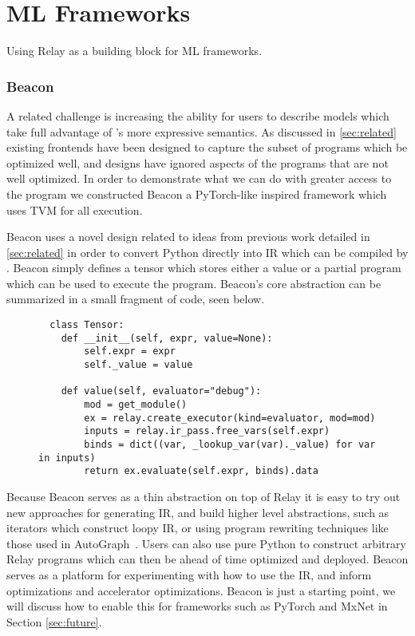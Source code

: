 \chapter{ML Frameworks}
\label{ch:frameworks}

Using Relay as a building block for ML frameworks.


\subsection{Beacon}

A related challenge is increasing the ability for users to describe models which take
  full advantage of \relay's more expressive semantics.
As discussed in \ref{sec:related} existing frontends have been designed to capture the
  subset of programs which be optimized well, and designs have ignored aspects of the
  programs that are not well optimized.
In order to demonstrate what we can do with greater access to the program we constructed
  Beacon a PyTorch-like inspired framework which uses TVM for all execution.

Beacon uses a novel design related to ideas from previous work detailed in \ref{sec:related}
  in order to convert Python directly into IR which can be compiled by \relay.
Beacon simply defines a tensor which stores either a value or a partial program
  which can be used to execute the program.
Beacon's core abstraction can be summarized in a small fragment of code, seen below.

\begin{figure}
\begin{verbatim}
  class Tensor:
    def __init__(self, expr, value=None):
        self.expr = expr
        self._value = value

    def value(self, evaluator="debug"):
        mod = get_module()
        ex = relay.create_executor(kind=evaluator, mod=mod)
        inputs = relay.ir_pass.free_vars(self.expr)
        binds = dict((var, _lookup_var(var)._value) for var in inputs)
        return ex.evaluate(self.expr, binds).data
\end{verbatim}
\end{figure}

Because Beacon serves as a thin abstraction on top of Relay it
  is easy to try out new approaches for generating IR, and build
  higher level abstractions, such as iterators which construct
  loopy IR, or using program rewriting techniques like those
  used in AutoGraph~\cite{AutoGraph}.
Users can also use pure Python to construct arbitrary Relay
  programs which can then be ahead of time optimized and
  deployed.
Beacon serves as a platform for experimenting with how
  to use the IR, and inform optimizations and accelerator optimizations.
Beacon is just a starting point, we will discuss how to enable this for frameworks
  such as PyTorch and MxNet in Section \ref{sec:future}.
